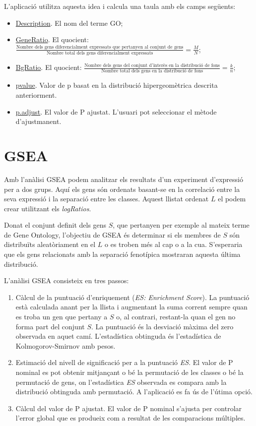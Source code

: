 L'aplicació utilitza aquesta idea i calcula una taula amb els camps següents:


\begin{itemize}
\item \underline{Description}. El nom del terme GO;
\item \underline{GeneRatio}. El quocient: $\displaystyle\frac{\mbox{Nombre dels gens diferencialment expressats que pertanyen al conjunt de gens}}{\mbox{Nombre total dels gens diferencialment expressats}}=\frac{M}{N}$; 
\item \underline{BgRatio}. El quocient: $\displaystyle\frac{\mbox{Nombre dels gens del conjunt d'interès en la distribució de fons}}{\mbox{Nombre total dels gens en la distribució de fons}}=\frac{k}{n}$;
\item \underline{pvalue}. Valor de p basat en la distribució hipergeomètrica descrita anteriorment.
\item \underline{p.adjust}. El valor de P ajustat. L'usuari pot seleccionar el mètode d'ajustmanent.
\end{itemize}


\section{GSEA}

Amb l'anàlisi GSEA podem analitzar els resultats d'un experiment d'expressió per a dos grups. Aquí els gens són ordenats basant-se en la correlació entre la seva expressió i la separació entre les classes. Aquest llistat ordenat $L$ el podem crear utilitzant els \textit{logRatios}.

Donat el conjunt definit dels gens $S$, que pertanyen per exemple al mateix terme de Gene Ontology, l'objectiu de GSEA és determinar si els membres de $S$ són distribuïts aleatòriament en el $L$ o es troben més al cap o a la cua. S'esperaria que els gens relacionats amb la separació fenotípica mostraran aquesta última distribució. 

L'anàlisi GSEA consisteix en tres passos:

\begin{enumerate}
\item Càlcul de la puntuació d'enriquement (\textit{ES: Enrichment Score}). La puntuació està calculada anant per la llista i augmentant la suma corrent sempre quan es troba un gen que pertany a $S$ o, al contrari, restant-la quan el gen no forma part del conjunt $S$. La puntuació és la desviació màxima del zero observada en aquet camí. L'estadística obtinguda és l’estadística de Kolmogorov-Smirnov amb pesos.

\item Estimació del nivell de significació per a la puntuació \textit{ES}. El valor de P nominal es pot obtenir mitjançant o bé la permutació de les classes o bé la permutació de gens, on l'estadística \textit{ES} observada es compara amb la distribució obtinguda amb permutació. A l'aplicació es fa ús de l'útima opció.
\item Càlcul del valor de P ajustat. El valor de P nominal s'ajusta per controlar l'error global que es produeix com a resultat de les comparacions múltiples.
\end{enumerate}

